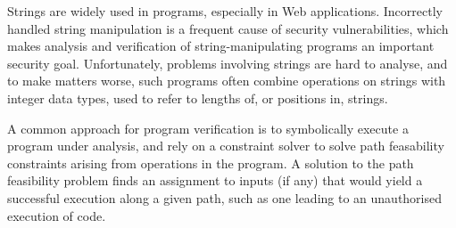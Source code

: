 
Strings are widely used in programs, especially in Web applications. Incorrectly handled string manipulation is a frequent cause of security vulnerabilities, which makes analysis and verification of string-manipulating programs an important security goal. Unfortunately, problems involving strings are hard to analyse, and to make matters worse, such programs often combine operations on strings with integer data types, used to refer to lengths of, or positions in, strings.

A common approach for program verification is to symbolically execute a program under analysis, and rely on a constraint solver to solve path feasability constraints arising from operations in the program. A solution to the path feasibility problem finds an assignment to inputs (if any) that would yield a successful execution along a given path, such as one leading to an unauthorised execution of code.

